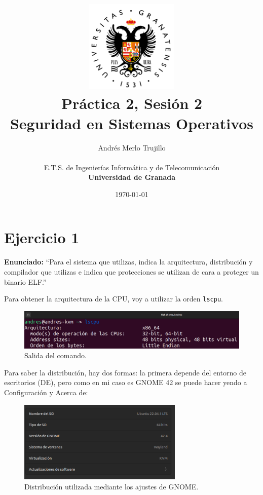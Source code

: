 \documentclass{article}
\title{
\includegraphics[width=1.75in]{imagenes/UGR-Logo.png} \\
\vspace*{1in}
\textbf{Práctica 2, Sesión 2} \\
Seguridad en Sistemas Operativos \\
\vspace*{0.5in}}
\author{Andrés Merlo Trujillo \\
\vspace*{0.5in} \\
E.T.S. de Ingenierías Informática y de Telecomunicación \\
\textbf{Universidad de Granada}} \date{\today}
\begin{document}
\begin{titlingpage}
    \maketitle
\end{titlingpage}

\tableofcontents

\newpage

\pagestyle{fancy}


\section{Ejercicio 1}

\textbf{Enunciado: }``Para el sistema que utilizas, indica la arquitectura, distribución y compilador que utilizas e indica que protecciones se utilizan de cara a proteger un binario ELF.''

\bigskip

Para obtener la arquitectura de la CPU, voy a utilizar la orden \verb|lscpu|.

\begin{figure}[H]
    \includegraphics[width=\textwidth]{imagenes/Captura desde 2022-11-23 10-33-11.png}
    \caption{Salida del comando.}
\end{figure}

\bigskip

Para saber la distribución, hay dos formas: la primera depende del entorno de escritorios (DE), pero como en mi caso es GNOME 42 se puede hacer yendo a Configuración y Acerca de:

\begin{figure}[H]
    \centering
    \includegraphics[width=0.7\textwidth]{imagenes/Captura desde 2022-11-23 10-37-46.png}
    \caption{Distribución utilizada mediante los ajustes de GNOME.}
\end{figure}
\end{document}
